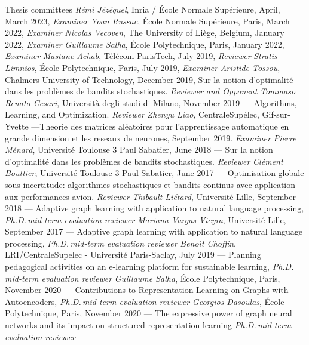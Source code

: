 \documentclass{resume}
\begin{document}
\begin{category}{Thesis committees}
\citembullet \emph{R\'emi J\'ez\'equel}, Inria / \'Ecole Normale Sup\'erieure, April, March 2023, \emph{Examiner}
\citembullet \emph{Yoan Russac}, \'Ecole Normale Sup\'erieure, Paris, March 2022, \emph{Examiner}
\citembullet \emph{Nicolas Vecoven}, The University of Li\`ege, Belgium, January 2022, \emph{Examiner}
\citembullet \emph{Guillaume Salha}, \'Ecole Polytechnique, Paris, January 2022,  \emph{Examiner}
\citembullet \emph{Mastane Achab}, T\' el\'ecom ParisTech,  July 2019, \emph{Reviewer}
\citembullet \emph{Stratis Limnios},  \'Ecole Polytechnique, Paris, July 2019, \emph{Examiner}
\citembullet \emph{Aristide Tossou}, Chalmers University of Technology, December 2019, 
Sur la notion d'optimalit\'e dans les probl\`emes de bandits stochastiques. \emph{Reviewer and Opponent}
\citembullet \emph{Tommaso Renato Cesari}, Universit\`a degli studi di Milano, November 2019 --- 
Algorithms, Learning, and Optimization. \emph{Reviewer}
\citembullet \emph{Zhenyu Liao}, CentraleSup\'elec, Gif-sur-Yvette ---Theorie des matrices al\'eatoires pour l’apprentissage automatique en grande
dimension et les reseaux de neurones, September 2019. \emph{Examiner}
\citembullet \emph{Pierre M\'enard}, Universit\'e Toulouse 3 Paul Sabatier, June 2018 ---
Sur la notion d'optimalit\'e dans les probl\`emes de bandits stochastiques. \emph{Reviewer}
\citembullet \emph{Cl\'ement Bouttier}, Universit\'e Toulouse 3 Paul Sabatier, June 2017 ---
Optimisation globale sous incertitude: algorithmes stochastiques et
bandits continus avec application aux performances avion. 
\emph{Reviewer}
\citembullet \emph{Thibault Li\' etard}, Universit\'e Lille, September 2018 ---
Adaptive graph learning with application
to natural language processing,
\emph{Ph.D.\,mid-term evaluation reviewer}
\citembullet \emph{Mariana Vargas Vieyra}, Universit\'e Lille, September 2017 ---
Adaptive graph learning with application to natural language processing,
\emph{Ph.D.\,mid-term evaluation reviewer}
\citembullet \emph{Beno\^{ı}t Choffin}, LRI/CentraleSupelec - Universit\'e Paris-Saclay, July 2019  ---
Planning pedagogical activities on an e-learning platform for
sustainable learning,
\emph{Ph.D.\,mid-term evaluation reviewer}
\citembullet \emph{Guillaume Salha}, \'Ecole Polytechnique, Paris, November 2020  ---
Contributions to Representation Learning on Graphs with Autoencoders,
\emph{Ph.D.\,mid-term evaluation reviewer}
\citembullet \emph{Georgios Dasoulas}, \'Ecole Polytechnique, Paris, November 2020 ---
The expressive power of graph neural networks and its impact on structured representation learning
\emph{Ph.D.\,mid-term evaluation reviewer}
\end{category}
\end{document}
